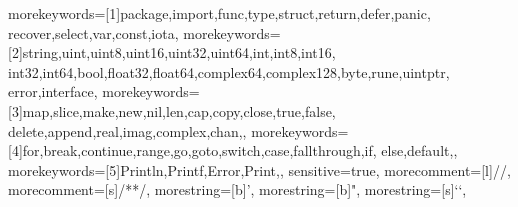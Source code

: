 

%
  {morekeywords=[1]{package,import,func,type,struct,return,defer,panic,%
     recover,select,var,const,iota},%
   morekeywords=[2]{string,uint,uint8,uint16,uint32,uint64,int,int8,int16,%
     int32,int64,bool,float32,float64,complex64,complex128,byte,rune,uintptr,%
     error,interface},%
   morekeywords=[3]{map,slice,make,new,nil,len,cap,copy,close,true,false,%
     delete,append,real,imag,complex,chan,},%
   morekeywords=[4]{for,break,continue,range,go,goto,switch,case,fallthrough,if,%
     else,default,},%
   morekeywords=[5]{Println,Printf,Error,Print,},%
   sensitive=true,%
   morecomment=[l]{//},%
   morecomment=[s]{/*}{*/},%
   morestring=[b]',%
   morestring=[b]",%
   morestring=[s]{`}{`},%
}